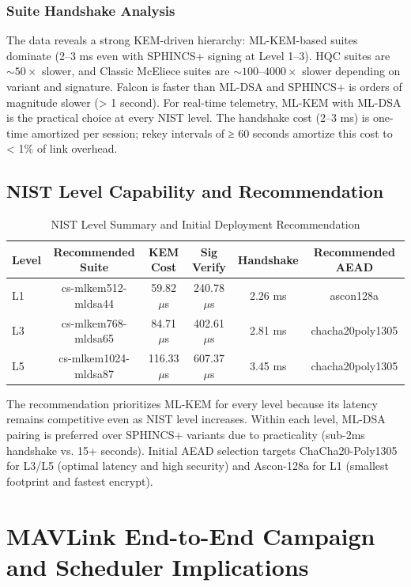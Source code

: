\documentclass[conference]{IEEEtran}
\begin{document}
\subsubsection{Suite Handshake Analysis}

The data reveals a strong KEM-driven hierarchy: ML-KEM-based suites dominate (2–3 ms even with SPHINCS+ signing at Level 1–3). HQC suites are $\sim 50\times$ slower, and Classic McEliece suites are $\sim 100–4000\times$ slower depending on variant and signature. Falcon is faster than ML-DSA and SPHINCS+ is orders of magnitude slower (> 1 second). For real-time telemetry, ML-KEM with ML-DSA is the practical choice at every NIST level. The handshake cost (2–3 ms) is one-time amortized per session; rekey intervals of ≥ 60 seconds amortize this cost to < 1\% of link overhead.

\subsection{NIST Level Capability and Recommendation}

\begin{table}[htbp]
\centering
\caption{NIST Level Summary and Initial Deployment Recommendation}
\begin{tabular}{lccccc}
\toprule
\textbf{Level} & \textbf{Recommended Suite} & \textbf{KEM Cost} & \textbf{Sig Verify} & \textbf{Handshake} & \textbf{Recommended AEAD} \\
\midrule
L1 & cs-mlkem512-mldsa44 & 59.82 $\mu$s & 240.78 $\mu$s & 2.26 ms & ascon128a \\
L3 & cs-mlkem768-mldsa65 & 84.71 $\mu$s & 402.61 $\mu$s & 2.81 ms & chacha20poly1305 \\
L5 & cs-mlkem1024-mldsa87 & 116.33 $\mu$s & 607.37 $\mu$s & 3.45 ms & chacha20poly1305 \\
\bottomrule
\end{tabular}
\end{table}

The recommendation prioritizes ML-KEM for every level because its latency remains competitive even as NIST level increases. Within each level, ML-DSA pairing is preferred over SPHINCS+ variants due to practicality (sub-2ms handshake vs. 15+ seconds). Initial AEAD selection targets ChaCha20-Poly1305 for L3/L5 (optimal latency and high security) and Ascon-128a for L1 (smallest footprint and fastest encrypt).

\section{MAVLink End-to-End Campaign and Scheduler Implications}
\end{document}
